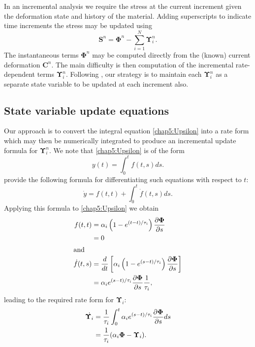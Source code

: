 \bigskip

\noindent In an incremental analysis we require the stress at the current increment given the deformation state and history of the material. Adding superscripts to indicate time increments the stress may be updated using
\begin{equation}
\label{chap5:updateStress}
\mathbf{S}^n = \boldsymbol \Phi^n - \sum_{i=1}^N \boldsymbol \Upsilon_i^n. 
\end{equation}
The instantaneous terms $ \boldsymbol \Phi^n $ may be computed directly from the (known) current deformation $ \mathbf{C}^n $. The main difficulty is then computation of the incremental rate-dependent terms $ \boldsymbol \Upsilon_i^n $. Following \cite{Poon98}, our strategy is to maintain each $ \boldsymbol \Upsilon_i^n $ as a separate state variable to be updated at each increment also.

	\subsection{State variable update equations}	
Our approach is to convert the integral equation \eqref{chap5:Upsilon} into a rate form which may then be numerically integrated to produce an incremental update formula for $ \boldsymbol \Upsilon_i^n $. We note that \eqref{chap5:Upsilon} is of the form
\begin{equation}
y(t) = \int_0^t f(t,s) ds.
\end{equation}
\cite{Poon98} provide the following formula for differentiating such equations with respect to $ t $:
\begin{equation}
\dot y = f(t, t) + \int_0^t \dot f(t,s) ds.
\end{equation}
Applying this formula to \eqref{chap5:Upsilon} we obtain
\begin{align}
f(t, t) &= \alpha_i \left( 1-e^{(t-t)/\tau_i} \right) \dfrac{\partial \boldsymbol \Phi}{\partial s} \notag \\
&= 0 \\
\intertext{and}
\dot f(t, s) &= \dfrac{d}{dt} \left[ \alpha_i \left( 1-e^{(s-t)/\tau_i} \right) \dfrac{\partial \boldsymbol \Phi}{\partial s} \right] \notag \\
&= \alpha_i e^{(s-t)/\tau_i} \dfrac{\partial \boldsymbol \Phi}{\partial s} \dfrac{1}{\tau_i},
\end{align}
leading to the required rate form for $ \boldsymbol \Upsilon_i $:
\begin{align}
\dot{\boldsymbol \Upsilon_i}  &= \dfrac{1}{\tau_i} \int_0^t \alpha_i e^{(s-t)/\tau_i} \dfrac{\partial \boldsymbol \Phi}{\partial s} ds \notag \\
&= \dfrac{1}{\tau_i} (\alpha_i \boldsymbol \Phi - \boldsymbol \Upsilon_i). \label{chap5:UpsilonRate}
\end{align}

